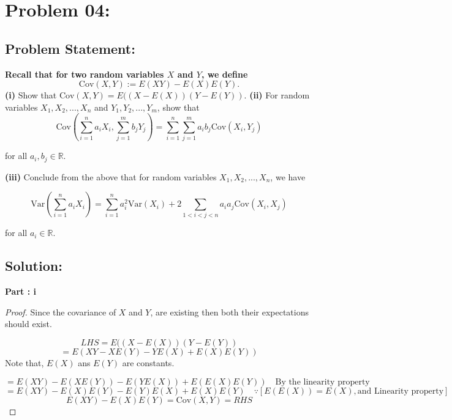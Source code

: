 \documentclass{article}
\theoremstyle{definition}
\begin{document}
\section{Problem 04:}
\begin{mdframed}[style = MyFrame]
\subsection{Problem Statement:}

\begin{center}

\textbf{Recall that for two random variables $X$ and $Y$, we define}
\begin{equation}
\text{Cov}(X, Y) := E(XY) - E(X)E(Y).
\end{equation}
\textbf{(i)} Show that $\text{Cov}(X, Y) = E((X - E(X))(Y - E(Y))$.
\textbf{(ii)} For random variables $X_1, X_2, ..., X_n$ and $Y_1, Y_2, ..., Y_m$, show that
\begin{equation}
\text{Cov} \left( \sum_{i=1}^n a_i X_i, \sum_{j=1}^m b_j Y_j \right) = \sum_{i=1}^n \sum_{j=1}^m a_i b_j \text{Cov}(X_i, Y_j)
\end{equation}

for all $a_i, b_j \in \mathbb{R}$.

\textbf{(iii)} Conclude from the above that for random variables $X_1, X_2, ..., X_n$, we have

\begin{equation}
\text{Var} \left( \sum_{i=1}^n a_iX_i \right) = \sum_{i=1}^n a_i^2 \text{Var}(X_i) + 2 \sum_{1 < i < j < n} a_ia_j\text{Cov}(X_i, X_j)
\end{equation}

for all $a_i \in \mathbb{R}$.

\end{center}   
\end{mdframed}
\subsection{Solution:}
\textbf{Part : i}\\
\begin{proof}
    Since the covariance of $X$ and $Y$, are existing then both their expectations should exist.
    
    \[
    LHS =  E((X - E(X))(Y - E(Y))
    \]
    \[
    = E(XY - XE(Y) - YE(X) + E(X)E(Y))
    \]
    Note that, $E(X)$ ans $E(Y)$ are constants.
    
\[
 = E(XY) - E(XE(Y)) - E(YE(X)) + E(E(X)E(Y)) \quad \text{By the linearity property}
\]
\[
= E(XY) - E(X)E(Y) - E(Y)E(X) + E(X)E(Y) \quad \because [E(E(X)) = E(X), \text{and Linearity property}]
\]
\[
E(XY) - E(X)E(Y) = \text{Cov}(X, Y) = RHS
\]



    
\end{proof}
\end{document}
